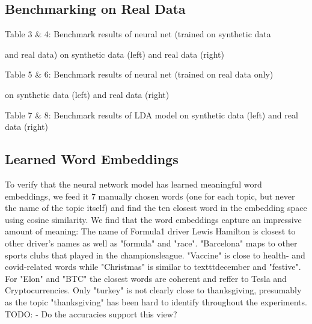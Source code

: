 \documentclass[11pt]{article}
\begin{document}
\subsection{Benchmarking on Real Data}


\begin{center}

\qquad

\end{center}
\begin{center}
Table 3 \& 4: Benchmark results of neural net (trained on synthetic data 

and real data) on synthetic data (left) and real data (right)
\end{center}

\begin{center}

\qquad

\end{center}
\begin{center}
Table 5 \& 6: Benchmark results of neural net (trained on real data only)

 on synthetic data (left) and real data (right)
\end{center}

\begin{center}

\qquad

\end{center}
\begin{center}
Table 7 \& 8: Benchmark results of LDA model on synthetic data (left) and real data (right)


\end{center}

\subsection{Learned Word Embeddings}
To verify that the neural network model has learned meaningful word embeddings, we feed it 7 manually chosen words (one for each topic, but never the name of the topic itself) and find the ten closest word in the embedding space using cosine similarity. We find that the word embeddings capture an impressive amount of meaning: The name of Formula1 driver Lewis Hamilton is closest to other driver's names as well as "formula" and "race". "Barcelona" maps to other sports clubs that played in the championsleague. "Vaccine" is close to health- and covid-related words while "Christmas" is similar to texttt{december} and "festive". For "Elon" and "BTC" the closest words are coherent and reffer to Tesla and Cryptocurrencies. Only "turkey" is not clearly close to thanksgiving, presumably as the topic "thanksgiving" has been hard to identify throughout the experiments.
TODO:
- Do the accuracies support this view?
\end{document}
